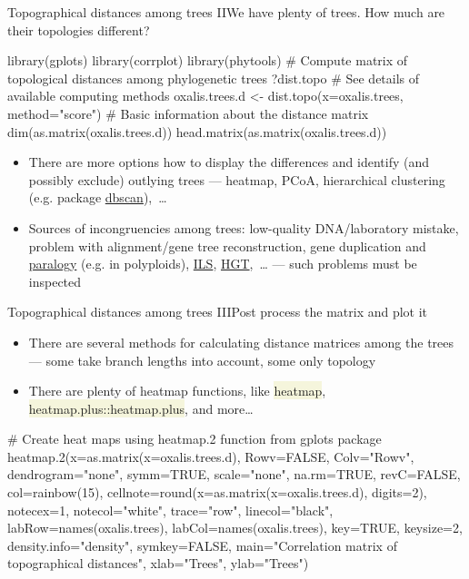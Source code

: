 \documentclass[compress, ucs, xelatex, 11pt, xcolor=svgnames, aspectratio=169,
	hyperref={
		bookmarks=true,
		unicode=true,
		colorlinks=true,
		pdftitle={Molecular data in R},
		plainpages=false,
		pdfauthor={Vojtech Zeisek},
		pdfsubject={Course about phylogeny and evolution in R},
		pdfcreator={XeLaTeX},
		pdfkeywords={R, evolution, phylogeny, molecular data},
		linkcolor=Crimson, %
		anchorcolor=Magenta, %
		citecolor=Magenta, %
		filecolor=Magenta, %
		menucolor=Magenta, %
		urlcolor=DodgerBlue, %
		pdftex},
	url={hyphens, lowtilde} %
	]{beamer}
\renewcommand{\texttt}[1]{\colorbox{Beige}{{\ttfamily #1}}}
\begin{document}
\begin{frame}[fragile]{Topographical distances among trees II}{We have plenty of trees. How much are their topologies different?}
	\begin{spluscode}
    library(gplots)
    library(corrplot)
    library(phytools)
    # Compute matrix of topological distances among phylogenetic trees
    ?dist.topo # See details of available computing methods
    oxalis.trees.d <- dist.topo(x=oxalis.trees, method="score")
    # Basic information about the distance matrix
    dim(as.matrix(oxalis.trees.d))
    head.matrix(as.matrix(oxalis.trees.d))
	\end{spluscode}
	\begin{itemize}
		\item There are more options how to display the differences and identify (and possibly exclude) outlying trees --- heatmap, PCoA, hierarchical clustering (e.g. package \href{https://CRAN.R-project.org/package=dbscan}{dbscan}),~\ldots
		\item Sources of incongruencies among trees: low-quality DNA/laboratory mistake, problem with alignment/gene tree reconstruction, gene duplication and \href{https://en.wikipedia.org/wiki/Sequence_homology}{paralogy} (e.g. in polyploids), \href{https://en.wikipedia.org/wiki/Incomplete_lineage_sorting}{ILS}, \href{https://en.wikipedia.org/wiki/Horizontal_gene_transfer}{HGT},~\ldots{ } --- such problems must be inspected
	\end{itemize}
\end{frame}

\begin{frame}[fragile]{Topographical distances among trees III}{Post process the matrix and plot it}
	\begin{itemize}
		\item There are several methods for calculating distance matrices among the trees --- some take branch lengths into account, some only topology
		\item There are plenty of heatmap functions, like \texttt{heatmap}, \texttt{heatmap.plus::heatmap.plus}, and more\ldots
	\end{itemize}
	\begin{spluscode}
    # Create heat maps using heatmap.2 function from gplots package
    heatmap.2(x=as.matrix(x=oxalis.trees.d), Rowv=FALSE, Colv="Rowv",
      dendrogram="none", symm=TRUE, scale="none", na.rm=TRUE, revC=FALSE,
      col=rainbow(15), cellnote=round(x=as.matrix(x=oxalis.trees.d), digits=2),
      notecex=1, notecol="white", trace="row", linecol="black",
      labRow=names(oxalis.trees), labCol=names(oxalis.trees), key=TRUE,
      keysize=2, density.info="density", symkey=FALSE, main="Correlation
      matrix of topographical distances", xlab="Trees", ylab="Trees")
	\end{spluscode}
\end{frame}
\end{document}
